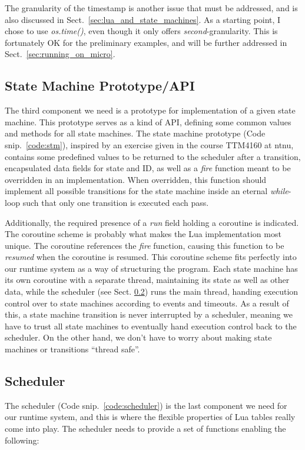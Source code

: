 \noindent
The granularity of the timestamp is another issue that must be addressed, and is also discussed in Sect.~\ref{sec:lua_and_state_machines}. As a starting point, I chose to use \emph{os.time()}, even though it only offers \emph{second}-granularity. This is fortunately OK for the preliminary examples, and will be further addressed in Sect.~\ref{sec:running_on_micro}.

\subsection{State Machine Prototype/API}
\label{sec:impl_stm}
The third component we need is a prototype for implementation of a given state machine. This prototype serves as a kind of API, defining some common values and methods for all state machines. The state machine prototype (Code snip.~\ref{code:stm}), inspired by an exercise given in the course TTM4160 at \gls{ntnu}, contains some predefined values to be returned to the scheduler after a transition, encapsulated data fields for state and ID, as well as a \emph{fire} function meant to be overridden in an implementation. When overridden, this function should implement all possible transitions for the state machine inside an eternal \emph{while}-loop such that only one transition is executed each pass.

\noindent
Additionally, the required presence of a \emph{run} field holding a coroutine is indicated. The coroutine scheme is probably what makes the Lua implementation most unique. The coroutine references the \emph{fire} function, causing this function to be \emph{resumed} when the coroutine is resumed. This coroutine scheme fits perfectly into our runtime system as a way of structuring the program. Each state machine has its own coroutine with a separate thread, maintaining its state as well as other data, while the scheduler (see Sect. \ref{sec:impl_sched}) runs the main thread, handing execution control over to state machines according to events and timeouts. As a result of this, a state machine transition is never interrupted by a scheduler, meaning we have to trust all state machines to eventually hand execution control back to the scheduler. On the other hand, we don't have to worry about making state machines or transitions ``thread safe''.

\subsection{Scheduler}
\label{sec:impl_sched}
The scheduler (Code snip.~\ref{code:scheduler}) is the last component we need for our runtime system, and this is where the flexible properties of Lua tables really come into play. The scheduler needs to provide a set of functions enabling the following:

